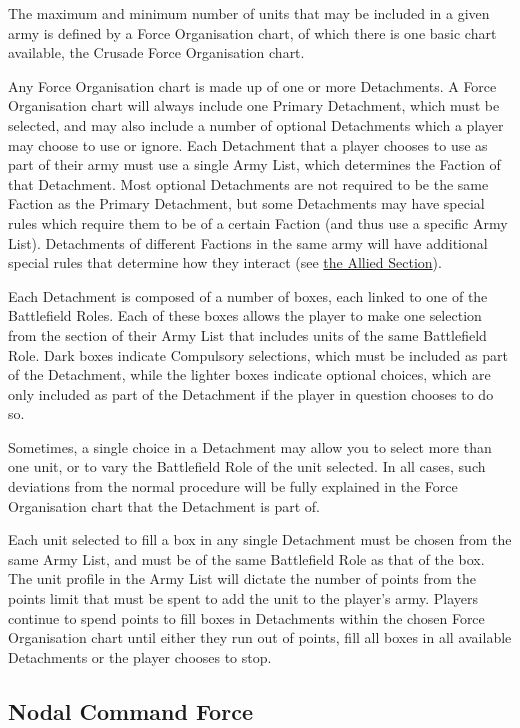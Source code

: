 The maximum and minimum number of units that may be included in a given army is defined by a Force Organisation chart, of which there is one basic chart available, the Crusade Force Organisation chart. 

Any Force Organisation chart is made up of one or more Detachments. A Force Organisation chart will always include one Primary Detachment, which must be selected, and may also include a number of optional Detachments which a player may choose to use or ignore. Each Detachment that a player chooses to use as part of their army must use a single Army List, which determines the Faction of that Detachment. Most optional Detachments are not required to be the same Faction as the Primary Detachment, but some Detachments may have special rules which require them to be of a certain Faction (and thus use a specific Army List). Detachments of different Factions in the same army will have additional special rules that determine how they interact (see \hyperref[allies]{the Allied Section}).

Each Detachment is composed of a number of boxes, each linked to one of the Battlefield Roles. Each of these boxes allows the player to make one selection from the section of their Army List that includes units of the same Battlefield Role. Dark boxes indicate Compulsory selections, which must be included as part of the Detachment, while the lighter boxes indicate optional choices, which are only included as part of the Detachment if the player in question chooses to do so.

Sometimes, a single choice in a Detachment may allow you to select more than one unit, or to vary the Battlefield Role of the unit selected. In all cases, such deviations from the normal procedure will be fully explained in the Force Organisation chart that the Detachment is part of.
 
Each unit selected to fill a box in any single Detachment must be chosen from the same Army List, and must be of the same Battlefield Role as that of the box. The unit profile in the Army List will dictate the number of points from the points limit that must be spent to add the unit to the player’s army. Players continue to spend points to fill boxes in Detachments within the chosen Force Organisation chart until either they run out of points, fill all boxes in all available Detachments or the player chooses to stop.

\subsection{Nodal Command Force}

